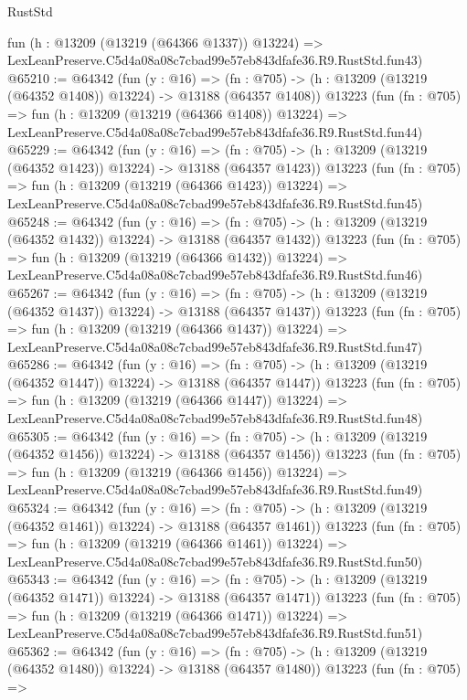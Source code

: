 \begin{lexlean}{RustStd}
\begin{coremodule}
    fun (h : @13209 (@13219 (@64366 @1337)) @13224) =>
    LexLeanPreserve.C5d4a08a08c7cbad99e57eb843dfafe36.R9.RustStd.fun43)
@65210 := @64342
    (fun (y : @16) =>
    (fn : @705) -> (h : @13209 (@13219 (@64352 @1408)) @13224) -> @13188 (@64357 @1408))
    @13223
    (fun (fn : @705) =>
    fun (h : @13209 (@13219 (@64366 @1408)) @13224) =>
    LexLeanPreserve.C5d4a08a08c7cbad99e57eb843dfafe36.R9.RustStd.fun44)
@65229 := @64342
    (fun (y : @16) =>
    (fn : @705) -> (h : @13209 (@13219 (@64352 @1423)) @13224) -> @13188 (@64357 @1423))
    @13223
    (fun (fn : @705) =>
    fun (h : @13209 (@13219 (@64366 @1423)) @13224) =>
    LexLeanPreserve.C5d4a08a08c7cbad99e57eb843dfafe36.R9.RustStd.fun45)
@65248 := @64342
    (fun (y : @16) =>
    (fn : @705) -> (h : @13209 (@13219 (@64352 @1432)) @13224) -> @13188 (@64357 @1432))
    @13223
    (fun (fn : @705) =>
    fun (h : @13209 (@13219 (@64366 @1432)) @13224) =>
    LexLeanPreserve.C5d4a08a08c7cbad99e57eb843dfafe36.R9.RustStd.fun46)
@65267 := @64342
    (fun (y : @16) =>
    (fn : @705) -> (h : @13209 (@13219 (@64352 @1437)) @13224) -> @13188 (@64357 @1437))
    @13223
    (fun (fn : @705) =>
    fun (h : @13209 (@13219 (@64366 @1437)) @13224) =>
    LexLeanPreserve.C5d4a08a08c7cbad99e57eb843dfafe36.R9.RustStd.fun47)
@65286 := @64342
    (fun (y : @16) =>
    (fn : @705) -> (h : @13209 (@13219 (@64352 @1447)) @13224) -> @13188 (@64357 @1447))
    @13223
    (fun (fn : @705) =>
    fun (h : @13209 (@13219 (@64366 @1447)) @13224) =>
    LexLeanPreserve.C5d4a08a08c7cbad99e57eb843dfafe36.R9.RustStd.fun48)
@65305 := @64342
    (fun (y : @16) =>
    (fn : @705) -> (h : @13209 (@13219 (@64352 @1456)) @13224) -> @13188 (@64357 @1456))
    @13223
    (fun (fn : @705) =>
    fun (h : @13209 (@13219 (@64366 @1456)) @13224) =>
    LexLeanPreserve.C5d4a08a08c7cbad99e57eb843dfafe36.R9.RustStd.fun49)
@65324 := @64342
    (fun (y : @16) =>
    (fn : @705) -> (h : @13209 (@13219 (@64352 @1461)) @13224) -> @13188 (@64357 @1461))
    @13223
    (fun (fn : @705) =>
    fun (h : @13209 (@13219 (@64366 @1461)) @13224) =>
    LexLeanPreserve.C5d4a08a08c7cbad99e57eb843dfafe36.R9.RustStd.fun50)
@65343 := @64342
    (fun (y : @16) =>
    (fn : @705) -> (h : @13209 (@13219 (@64352 @1471)) @13224) -> @13188 (@64357 @1471))
    @13223
    (fun (fn : @705) =>
    fun (h : @13209 (@13219 (@64366 @1471)) @13224) =>
    LexLeanPreserve.C5d4a08a08c7cbad99e57eb843dfafe36.R9.RustStd.fun51)
@65362 := @64342
    (fun (y : @16) =>
    (fn : @705) -> (h : @13209 (@13219 (@64352 @1480)) @13224) -> @13188 (@64357 @1480))
    @13223
    (fun (fn : @705) =>

\end{coremodule}
\end{lexlean}
